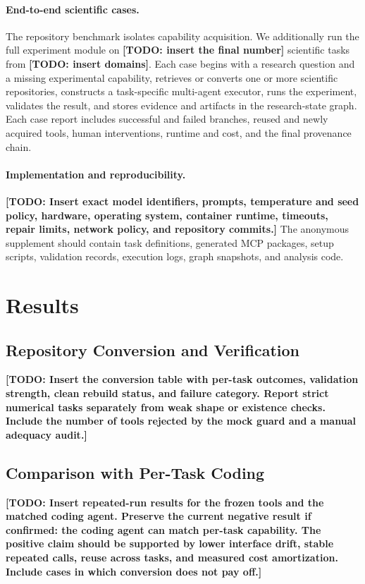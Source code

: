 \documentclass[letterpaper]{article} %
\newcommand{\drafttodo}[1]{\textbf{[TODO: #1]}}
\begin{document}
\paragraph{End-to-end scientific cases.}
The repository benchmark isolates capability acquisition. We additionally run the full experiment module on \drafttodo{insert the final number} scientific tasks from \drafttodo{insert domains}. Each case begins with a research question and a missing experimental capability, retrieves or converts one or more scientific repositories, constructs a task-specific multi-agent executor, runs the experiment, validates the result, and stores evidence and artifacts in the research-state graph. Each case report includes successful and failed branches, reused and newly acquired tools, human interventions, runtime and cost, and the final provenance chain.

\paragraph{Implementation and reproducibility.}
\drafttodo{Insert exact model identifiers, prompts, temperature and seed policy, hardware, operating system, container runtime, timeouts, repair limits, network policy, and repository commits.} The anonymous supplement should contain task definitions, generated MCP packages, setup scripts, validation records, execution logs, graph snapshots, and analysis code.

\section{Results}
\label{sec:results}

\subsection{Repository Conversion and Verification}

\drafttodo{Insert the conversion table with per-task outcomes, validation strength, clean rebuild status, and failure category. Report strict numerical tasks separately from weak shape or existence checks. Include the number of tools rejected by the mock guard and a manual adequacy audit.}

\subsection{Comparison with Per-Task Coding}

\drafttodo{Insert repeated-run results for the frozen tools and the matched coding agent. Preserve the current negative result if confirmed: the coding agent can match per-task capability. The positive claim should be supported by lower interface drift, stable repeated calls, reuse across tasks, and measured cost amortization. Include cases in which conversion does not pay off.}
\end{document}
